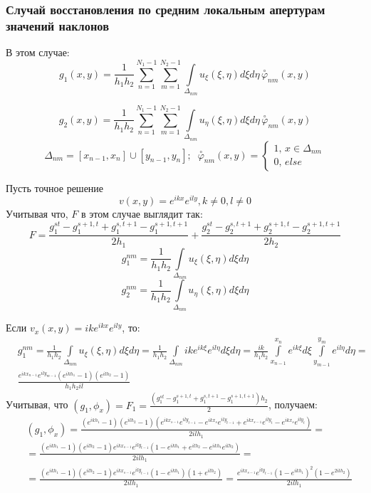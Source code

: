 \documentclass{article}
\begin{document}
\subsubsection{Случай восстановления по средним локальным апертурам значений наклонов}
В этом случае:
$$g_1(x,y) = \frac{1}{h_1h_2} \sum \limits_{n=1}^{N_1 - 1} \sum \limits_{m=1}^{N_2 - 1} \int \limits _{\Delta_{nm}} u_\xi(\xi,\eta) d\xi d\eta \, \overset{\circ}{\varphi}_{nm}(x,y)$$

$$g_2(x,y) = \frac{1}{h_1h_2} \sum \limits_{n=1}^{N_1 - 1} \sum \limits_{m=1}^{N_2 - 1} \int \limits _{\Delta_{nm}} u_\eta(\xi,\eta) d\xi d\eta \, \overset{\circ}{\varphi}_{nm}(x,y)$$
$$\Delta_{nm} = [x_{n-1}, x_n] \cup [y_{n-1}, y_n];\;\;\overset{\circ}{\varphi}_{nm}(x,y) = \begin{cases} 1, \, x \in \Delta_{nm} \\ 0, \, else\end{cases}$$

Пусть точное решение $$v(x,y) = e^{ikx}e^{ily}, k \neq 0, l \neq 0$$
Учитывая что, $F$ в этом случае выглядит так:
$$F = \frac{g_1^{st} - g_1^{s+1,t} + g_1^{s,t+1} - g_1^{s+1,t+1}}{2h_1} + \frac{g_2^{st} - g_2^{s,t+1} + g_2^{s+1,t} - g_2^{s+1, t+1}}{2h_2}$$
\begin{equation} \label{g_1}
g_1^{nm} = \frac{1}{h_1h_2}\int \limits _{\Delta_{nm}} u_\xi(\xi,\eta) d\xi d\eta
\end{equation}
\begin{equation}
g_2^{nm} = \frac{1}{h_1h_2}\int \limits _{\Delta_{nm}} u_\eta(\xi,\eta) d\xi d\eta
\end{equation}

Если $v_x(x,y) = ike^{ikx}e^{ily}$, то:
\begin{align*}
&g_1^{nm} = \frac{1}{h_1h_2} \int \limits _{\Delta_{nm}} u_\xi(\xi,\eta) d\xi d\eta = \frac{1}{h_1h_2} \int \limits _{\Delta_{nm}} ike^{ik\xi}e^{il\eta} d\xi d\eta = 
\frac{ik}{h_1 h_2} \int \limits_{x_{n-1}}^{x_n}e^{ik\xi}d\xi \int \limits_{y_{m-1}}^{y_m} e^{il\eta}d\eta = \\& \frac{e^{ikx_{n-1}} e ^{ily_{m-1}}(e^{ikh_1} - 1)(e^{ilh_2} - 1)}{h_1 h_2 il}
\end{align*}
Учитывая, что $(g_1, \phi_x) = F_1 = \frac{(g_1^{st} - g_1^{s+1,t} + g_1^{s,t+1} - g_1^{s+1,t+1})h_2}{2} $, получаем:
\begin{align*}
&(g_1, \phi_x) = \frac{(e^{ikh_1}-1)(e^{ilh_2} - 1)(e^{ikx_{s-1}}e^{ily_{t-1}} - 
e^{ikx_s}e^{ily_{t-1}} + e^{ikx_{s-1}}e^{ily_t} - e^{ikx_s}e^{ily_t})}{2ilh_1} = 
\\& = \frac{(e^{ikh_1}-1)(e^{ilh_2} - 1)e^{ikx_{s-1}}e^{ily_{t-1}}(1 - e^{ikh_1} + e^{ilh_2} - e^{ikh_1}e^{ilh_2})}{2ilh_1} = \\& = \frac{(e^{ikh_1}-1)(e^{ilh_2} - 1)e^{ikx_{s-1}}e^{ily_{t-1}}(1-e^{ikh_1})(1+e^{ilh_2})}{2ilh_1} = 
\frac{e^{ikx_{s-1}}e^{ily_{t-1}} (1-e^{ikh_1})^2(1-e^{2ilh_2})}{2ilh_1}
\end{align*}
\end{document}
